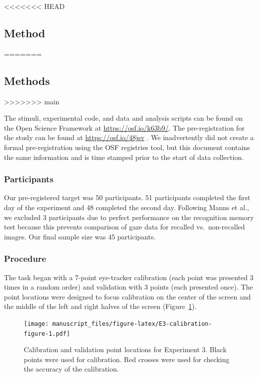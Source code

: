 \documentclass[
  man,floatsintext]{apa6}
\begin{document}
<<<<<<< HEAD
\subsection{Method}\label{method-2}
=======
\subsection{Methods}\label{methods-2}
>>>>>>> main

The stimuli, experimental code, and data and analysis scripts can be
found on the Open Science Framework at \url{https://osf.io/k63b9/}.
The pre-registration for the study can be
found at \url{https://osf.io/48jsv} . We
inadvertently did not create a formal pre-registration using the OSF
registries tool, but this document contains the same information and is
time stamped prior to the start of data collection.

\subsubsection{Participants}\label{participants-3}

Our pre-registered target was 50 participants. 51 participants completed
the first day of the experiment and 48 completed the second day.
Following Manns et al., we excluded 3 participants due to perfect
performance on the recognition memory test because this prevents
comparison of gaze data for recalled vs.~non-recalled images. Our final
sample size was 45 participants.

\subsubsection{Procedure}\label{procedure-2}

The task began with a 7-point eye-tracker calibration (each point was
presented 3 times in a random order) and validation with 3 points (each
presented once). The point locations were designed to focus calibration
on the center of the screen and the middle of the left and right halves
of the screen (Figure~\ref{fig:E3-calibration-figure}).

\begin{figure}
\centering
\texttt{[image: manuscript\_files/figure-latex/E3-calibration-figure-1.pdf]}
\caption{\label{fig:E3-calibration-figure}Calibration and validation point locations for Experiment 3. Black points were used for calibration. Red crosses were used for checking the accuracy of the calibration.}
\end{figure}
\end{document}
